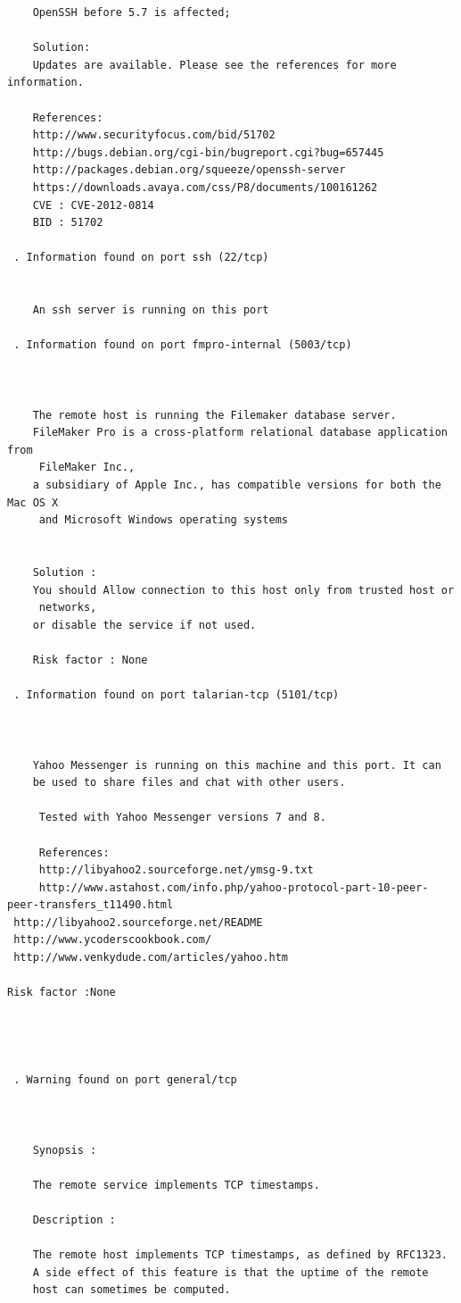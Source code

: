 \documentclass[twoside]{article}
\begin{document}
\begin{lstlisting}
    OpenSSH before 5.7 is affected; 
    
    Solution:
    Updates are available. Please see the references for more information.
    
    References:
    http://www.securityfocus.com/bid/51702
    http://bugs.debian.org/cgi-bin/bugreport.cgi?bug=657445
    http://packages.debian.org/squeeze/openssh-server
    https://downloads.avaya.com/css/P8/documents/100161262
    CVE : CVE-2012-0814
    BID : 51702

 . Information found on port ssh (22/tcp)


    An ssh server is running on this port

 . Information found on port fmpro-internal (5003/tcp)


    
    The remote host is running the Filemaker database server. 
    FileMaker Pro is a cross-platform relational database application from
     FileMaker Inc., 
    a subsidiary of Apple Inc., has compatible versions for both the Mac OS X
     and Microsoft Windows operating systems
    
    
    Solution :
    You should Allow connection to this host only from trusted host or
     networks,
    or disable the service if not used.
    
    Risk factor : None

 . Information found on port talarian-tcp (5101/tcp)


    
    Yahoo Messenger is running on this machine and this port. It can
    be used to share files and chat with other users.
    
     Tested with Yahoo Messenger versions 7 and 8.
    
     References:
     http://libyahoo2.sourceforge.net/ymsg-9.txt
     http://www.astahost.com/info.php/yahoo-protocol-part-10-peer-peer-transfers_t11490.html
 http://libyahoo2.sourceforge.net/README
 http://www.ycoderscookbook.com/
 http://www.venkydude.com/articles/yahoo.htm

Risk factor :None




 . Warning found on port general/tcp


    
    Synopsis :
    
    The remote service implements TCP timestamps.
    
    Description :
    
    The remote host implements TCP timestamps, as defined by RFC1323.
    A side effect of this feature is that the uptime of the remote 
    host can sometimes be computed.
    

\end{lstlisting}
\end{document}
